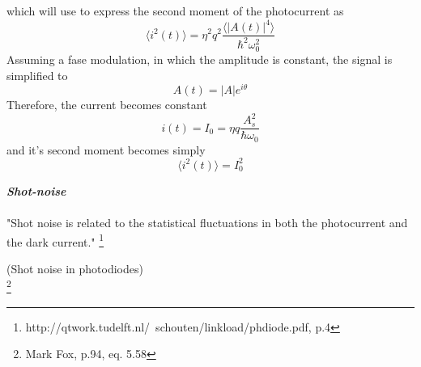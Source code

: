 \begin{bibunit}[plain]
%
which will use to express the second moment of the photocurrent as
\begin{equation}
	\langle i^2(t) \rangle = \eta^2 q^2 \frac{\langle |A(t)|^4 \rangle }{\hbar^2 \omega_0^2}
\end{equation}
%
Assuming a fase modulation, in which the amplitude is constant, the signal is simplified to
%
\begin{equation}
	A(t) = |A| e^{i \theta}
\end{equation}
%
Therefore, the current becomes constant
%
\begin{equation}
	i(t) = I_0 = \eta q \frac{A_s^2}{\hbar \omega_0}
\end{equation}
%
and it's second moment becomes simply
%
\begin{equation}
	\langle i^2(t) \rangle = I_0^2
\end{equation}




\vspace{2em}
\noindent
{\bf \em Shot-noise}\\
\\
"Shot noise is related to the statistical fluctuations in both the photocurrent and the dark current."
\footnote{http://qtwork.tudelft.nl/~schouten/linkload/phdiode.pdf, p.4}

(Shot noise in photodiodes)\\
\footnote{Mark Fox, p.94, eq. 5.58}
%


\end{bibunit}
